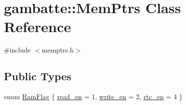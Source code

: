 \hypertarget{classgambatte_1_1MemPtrs}{}\section{gambatte\+:\+:Mem\+Ptrs Class Reference}
\label{classgambatte_1_1MemPtrs}


{\ttfamily \#include $<$memptrs.\+h$>$}

\subsection*{Public Types}
\begin{DoxyCompactItemize}
\item 
enum \hyperlink{classgambatte_1_1MemPtrs_ad83f0b1d75651c98df85250dcf197362}{Ram\+Flag} \{ \hyperlink{classgambatte_1_1MemPtrs_ad83f0b1d75651c98df85250dcf197362a0167f3624ca21d61111da8aab5f738a7}{read\+\_\+en} = 1, 
\hyperlink{classgambatte_1_1MemPtrs_ad83f0b1d75651c98df85250dcf197362af42883c45047d0a06a7884eb1b0d3ba6}{write\+\_\+en} = 2, 
\hyperlink{classgambatte_1_1MemPtrs_ad83f0b1d75651c98df85250dcf197362ae29916ab2099264fd76ad43dd8dddd94}{rtc\+\_\+en} = 4
 \}
\end{DoxyCompactItemize}
